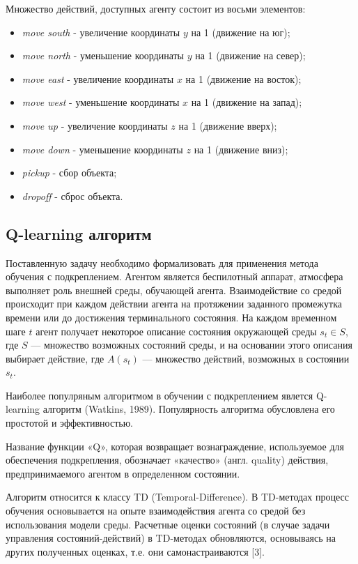 \documentclass[a4paper]{report}
\theoremstyle{definition}
\theoremstyle{plain}
\theoremstyle{remark}
\theoremstyle{remark}
\theoremstyle{definition}
\begin{document}
Множество действий, доступных агенту состоит из восьми элементов:
\begin{itemize}
  	\item \textit{move south} - увеличение координаты $y$ на 1 (движение на юг);
	\item \textit{move north} - уменьшение координаты $y$ на 1 (движение на север);
	\item \textit{move east} - увеличение координаты $x$ на 1 (движение на восток);
	\item \textit{move west} - уменьшение координаты $x$ на 1 (движение на запад);
	\item \textit{move up} - увеличение координаты $z$ на 1 (движение вверх);
	\item \textit{move down} - уменьшение координаты $z$ на 1 (движение вниз);
	\item \textit{pickup} - сбор объекта;
	\item \textit{dropoff} - сброс объекта.	
\end{itemize}


\newpage
\begin{center}
\section{Q-learning алгоритм}
\end{center}

Поставленную задачу необходимо формализовать для применения метода обучения с подкреплением. Агентом является беспилотный аппарат, атмосфера выполняет роль внешней среды, обучающей агента. Взаимодействие со средой происходит при каждом действии агента на протяжении заданного промежутка времени или до достижения терминального состояния. На каждом временном шаге $ t $ агент получает некоторое описание состояния окружающей среды $ s_{t} \in S$, где $ S $ — множество возможных состояний среды, и на основании этого описания выбирает действие, где $ A(s_{t}) $ — множество действий, возможных в состоянии $s_{t}$.

Наиболее популряным алгоритмом в обучении с подкреплением явлется Q-learning алгоритм (Watkins, 1989). Популярность алгоритма обусловлена его простотой и эффективностью.

Название функции «Q», которая возвращает вознаграждение, используемое для обеспечения подкрепления, обозначает «качество» (англ. quality) действия, предпринимаемого агентом в определенном состоянии. 

Алгоритм относится к классу TD (Temporal-Difference). В TD-методах процесс обучения основывается на опыте взаимодействия агента со средой без использования модели среды. Расчетные оценки состояний (в случае задачи управления состояний-действий) в TD-методах обновляются, основываясь на других полученных оценках, т.е. они самонастраиваются [3].
\end{document}
